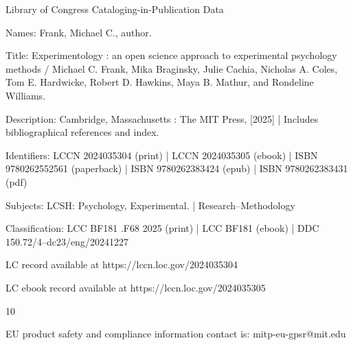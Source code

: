 \begin{titlepage}
{  \begin{tcolorbox}[size=minimal, boxrule=0pt, width=0.6\linewidth]
    {\scriptsize
    \raggedright
    \leftskip 0.15in
    \parindent -0.15in
    Library of Congress Cataloging-in-Publication Data
    \parskip 0in
    
    Names: Frank, Michael C., author.
    
    Title: Experimentology : an open science approach to experimental 
       psychology methods / Michael C. Frank, Mika Braginsky, Julie Cachia, 
       Nicholas A. Coles, Tom E. Hardwicke, Robert D. Hawkins, Maya B. Mathur, and 
       Rondeline Williams.
      
    Description: Cambridge, Massachusetts : The MIT Press, [2025] | Includes 
       bibliographical references and index.
       
    Identifiers: LCCN 2024035304 (print) | LCCN 2024035305 (ebook) | ISBN 
       9780262552561 (paperback) | ISBN 9780262383424 (epub) | ISBN 
       9780262383431 (pdf)
       
    Subjects: LCSH: Psychology, Experimental. | Research--Methodology
    
    Classification: LCC BF181 .F68 2025  (print) | LCC BF181  (ebook) | DDC 
       150.72/4--dc23/eng/20241227
       
    LC record available at https://lccn.loc.gov/2024035304
    
    LC ebook record available at https://lccn.loc.gov/2024035305\par
    }
  \end{tcolorbox}
  
    10\par
    \vspace{2ex}
    EU product safety and compliance information contact is: mitp-eu-gpsr@mit.edu
  }
  \vspace*{\fill}
\end{titlepage}

\restoregeometry{}
